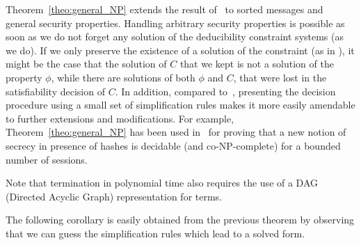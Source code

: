 \documentclass[acmtocl,acmnow]{acmtrans2m}
\newcommand{\dedsyss}[1]{deducibility constraint systems}
\begin{document}
Theorem~\ref{theo:general_NP} extends the result of~\cite{RT01} to
sorted messages and general security properties.
Handling arbitrary security properties is possible as soon as we
do not forget any solution of the \dedsyss{} (as we do). If we only
preserve the existence of a solution of the constraint (as in \cite{RT01}),
it might be the case that the solution of $C$ that we kept is not a solution
of the property $\phi$, while there are solutions of both $\phi$ and $C$,
that were lost in the satisfiability decision of $C$. 
In addition, compared to~\cite{RT01}, presenting the decision
procedure using a small set of simplification rules makes it more
easily amendable to further extensions and modifications.
For example, Theorem~\ref{theo:general_NP} has been used in~\cite{CKKW-fsttcs2006} for
proving that a new notion of secrecy in presence of hashes is
decidable (and co-NP-complete) for a bounded number of sessions.

Note that termination in polynomial time also requires the use of a
DAG (Directed Acyclic Graph) representation for terms.















The following corollary
is easily obtained from the previous theorem by observing that we
can guess the simplification rules which lead to a solved form.
\end{document}
